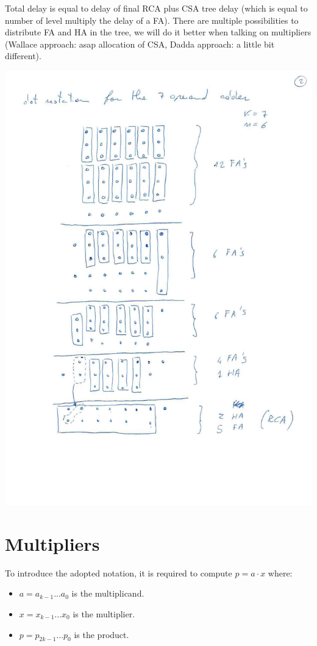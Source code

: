 Total delay is equal to delay of final RCA plus CSA tree delay (which is equal to number of level multiply the delay of a FA). There are multiple possibilities to distribute FA and HA in the tree, we will do it better when talking on multipliers (Wallace approach: asap allocation of CSA, Dadda approach: a little bit different).

\begin{center}
  \includegraphics[width=1.0\linewidth]{img/img2/31}
\end{center}


\chapter{Multipliers}

To introduce the adopted notation, it is required to compute $p=a \cdot x$ where:
\begin{itemize}
  \item $a=a_{k-1}...a_0$ is the multiplicand.
  \item $x=x_{k-1}...x_0$ is the multiplier.
  \item $p=p_{2k-1}...p_0$ is the product.

\end{itemize}

